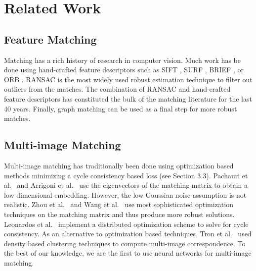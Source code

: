 \documentclass{article} %
\begin{document}
\section{Related Work}

\subsection{Feature Matching}
Matching has a rich history of research in computer vision.
Much work has be done using hand-crafted feature descriptors such as SIFT \cite{lowe2004distinctive}, SURF \cite{bay2006surf}, BRIEF \cite{calonder2012brief}, or ORB \cite{mur2015orb}.
RANSAC \cite{fischler1981random} is the most widely used robust estimation technique to filter out outliers from the matches.
The combination of RANSAC and hand-crafted feature descriptors has constituted the bulk of the matching literature for the last 40 years.
Finally, graph matching \cite{suh2015subgraph, hu2016distributable} can be used as a final step for more robust matches.

\subsection{Multi-image Matching}
Multi-image matching has traditionally been done using optimization based methods minimizing a cycle consistency based loss (see Section 3.3).
Pachauri et al.~\cite{pachauri2013solving} and Arrigoni et al.~\cite{arrigoni2017synchronization} use the eigenvectors of the matching matrix to obtain a low dimensional embedding. 
However, the low Gaussian noise assumption is not realistic.
Zhou et al.~\cite{zhou2015multi} and Wang et al.~\cite{wang2017multi} use most sophisticated optimization techniques on the matching matrix and thus produce more robust solutions.
Leonardos et al.~\cite{leonardos2016distributed} implement a distributed optimization scheme to solve for cycle consistency.
As an alternative to optimization based techniques, Tron et al.~\cite{tron2017fast} used density based clustering techniques to compute multi-image correspondence.
To the best of our knowledge, we are the first to use neural networks for multi-image matching.
\end{document}
